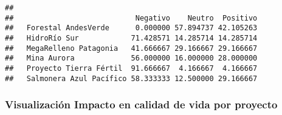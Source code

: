 \documentclass[
]{article}
\newenvironment{Shaded}{\begin{snugshade}}{\end{snugshade}}
\newcommand{\AttributeTok}[1]{\textcolor[rgb]{0.13,0.29,0.53}{#1}}
\newcommand{\DecValTok}[1]{\textcolor[rgb]{0.00,0.00,0.81}{#1}}
\newcommand{\DocumentationTok}[1]{\textcolor[rgb]{0.56,0.35,0.01}{\textbf{\textit{#1}}}}
\newcommand{\FunctionTok}[1]{\textcolor[rgb]{0.13,0.29,0.53}{\textbf{#1}}}
\newcommand{\NormalTok}[1]{#1}
\newcommand{\OtherTok}[1]{\textcolor[rgb]{0.56,0.35,0.01}{#1}}
\newcommand{\SpecialCharTok}[1]{\textcolor[rgb]{0.81,0.36,0.00}{\textbf{#1}}}
\begin{document}
\begin{Shaded}
\end{Shaded}

\begin{verbatim}
##                          
##                            Negativo    Neutro  Positivo
##   Forestal AndesVerde      0.000000 57.894737 42.105263
##   HidroRío Sur            71.428571 14.285714 14.285714
##   MegaRelleno Patagonia   41.666667 29.166667 29.166667
##   Mina Aurora             56.000000 16.000000 28.000000
##   Proyecto Tierra Fértil  91.666667  4.166667  4.166667
##   Salmonera Azul Pacífico 58.333333 12.500000 29.166667
\end{verbatim}

\subsubsection{\texorpdfstring{\textbf{Visualización Impacto en calidad
de vida por
proyecto}}{Visualización Impacto en calidad de vida por proyecto}}\label{visualizaciuxf3n-impacto-en-calidad-de-vida-por-proyecto}
\end{document}

